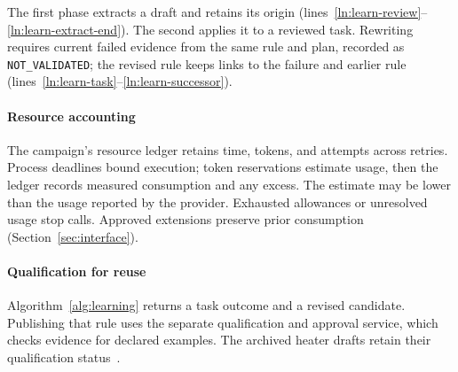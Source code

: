 The first phase extracts a draft and retains its origin (lines~\ref{ln:learn-review}--\ref{ln:learn-extract-end}). The second applies it to a reviewed task. Rewriting requires current failed evidence from the same rule and plan, recorded as \texttt{NOT\_VALIDATED}; the revised rule keeps links to the failure and earlier rule (lines~\ref{ln:learn-task}--\ref{ln:learn-successor}).

\paragraph{Resource accounting}
\label{sec:resource-accounting}
The campaign's resource ledger retains time, tokens, and attempts across retries. Process deadlines bound execution; token reservations estimate usage, then the ledger records measured consumption and any excess. The estimate may be lower than the usage reported by the provider. Exhausted allowances or unresolved usage stop calls. Approved extensions preserve prior consumption (Section~\ref{sec:interface}).

\paragraph{Qualification for reuse}
Algorithm~\ref{alg:learning} returns a task outcome and a revised candidate. Publishing that rule uses the separate qualification and approval service, which checks evidence for declared examples. The archived heater drafts retain their qualification status~\cite{scpCheckpoint}.
